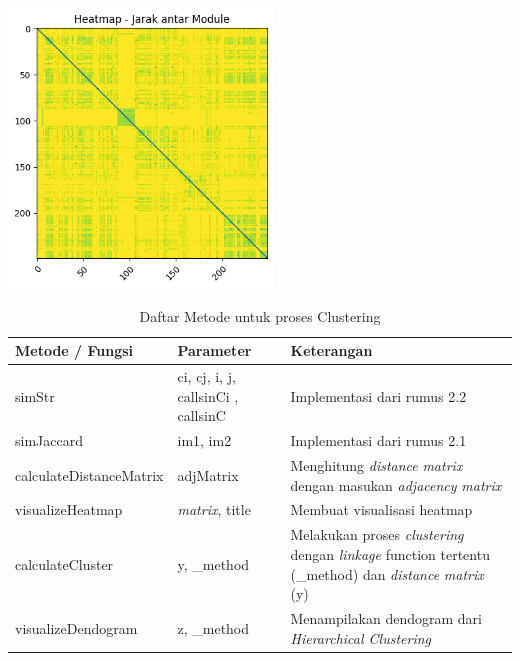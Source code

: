\begin{center}
	\includegraphics[width=7cm]{img/bab_4/HeatmapModule.png}
	\label{fig:heatmap_gambar}
\end{center}


\begingroup
\setlength{\LTleft}{-20cm plus -1fill}
\setlength{\LTright}{\LTleft}
\begin{small}
	\begin{longtable}{|p{4cm}|p{3cm}|p{6cm}|}
		\caption{Daftar Metode untuk proses Clustering}\\
		\hline
		\textbf{Metode / Fungsi} & \textbf{Parameter} & \textbf{Keterangan}\\
		\endfirsthead
		
		\hline  

		simStr
		& ci, cj, i, j, callsinCi , callsinC
		 & Implementasi dari rumus 2.2  \\

		 \hline  

		 simJaccard
		& im1, im2
		 & Implementasi dari rumus 2.1   \\

		 \hline  

		 calculateDistanceMatrix
		& adjMatrix
		 & Menghitung \textit{distance} \textit{matrix} dengan masukan \textit{adjacency} \textit{matrix}  \\

		 \hline  

		 visualizeHeatmap
		& \textit{matrix}, title
		 & Membuat visualisasi heatmap  \\

		 \hline  

		 calculateCluster
		& y, {\_}method
		 & Melakukan proses \textit{clustering} dengan \textit{linkage} function tertentu ({\_}method) dan \textit{distance} \textit{matrix} (y) \\

		 \hline
		
		 visualizeDendogram
		& z, {\_}method
		 & Menampilakan dendogram dari \textit{Hierarchical Clustering}  \\

		 \hline
	\end{longtable}
\end{small}
\endgroup

